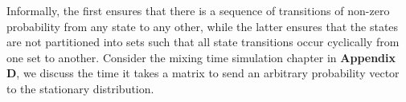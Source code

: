 Informally, the first ensures that there is a sequence of transitions of non-zero probability from any state to any other,
while the latter ensures that the states are not partitioned into sets such that all state transitions occur cyclically from one set to another.
Consider the mixing time simulation chapter in \textbf{Appendix D}, we discuss the time it takes a matrix to send an arbitrary probability vector to the stationary distribution.


